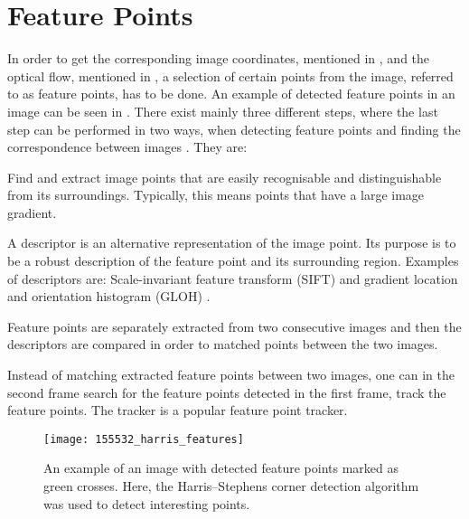 \clearpage

\section{Feature Points}
In order to get the corresponding image coordinates, mentioned in , and the optical flow, mentioned in , a selection of certain points from the image, referred to as feature points, has to be done.
An example of detected feature points in an image can be seen in .
There exist mainly three different steps, where the last step can be performed in two ways, when detecting feature points and finding the correspondence between images \cite{Szeliski:2011}.
They are:

\begin{description}[align=left,labelwidth=3cm]
	\item [Feature detection] Find and extract image points that are easily recognisable and distinguishable from its surroundings. Typically, this means points that have a large image gradient.
	\item [Feature description] A descriptor is an alternative representation of the image point. Its purpose is to be a robust description of the feature point and its surrounding region. Examples of descriptors are: Scale-invariant feature transform (SIFT) and gradient location and orientation histogram (GLOH) \cite{Szeliski:2011}.
	\item [Feature matching] Feature points are separately extracted from two consecutive images and then the descriptors are compared in order to matched points between the two images.
	\item [Feature tracking] Instead of matching extracted feature points between two images, one can in the second frame search for the feature points detected in the first frame, \ie track the feature points. The \abbrKLT tracker is a popular feature point tracker.
\end{description}

\begin{figure}[!ht]
	\centering
	\texttt{[image: 155532\_harris\_features]}
	\caption{\label{fig:featurepointexample} An example of an image with detected feature points marked as green crosses. Here, the Harris–Stephens corner detection algorithm \cite{Harris:1988} was used to detect interesting points.}
\end{figure}

